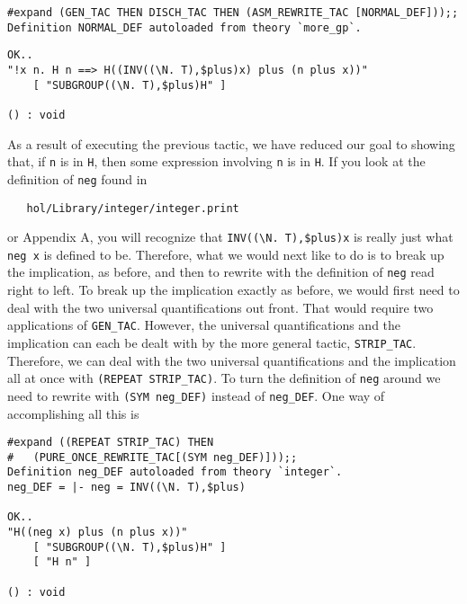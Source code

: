 \begin{session}
\begin{verbatim}
#expand (GEN_TAC THEN DISCH_TAC THEN (ASM_REWRITE_TAC [NORMAL_DEF]));;
Definition NORMAL_DEF autoloaded from theory `more_gp`.
\end{verbatim}
\mvdots
\begin{verbatim}
OK..
"!x n. H n ==> H((INV((\N. T),$plus)x) plus (n plus x))"
    [ "SUBGROUP((\N. T),$plus)H" ]

() : void
\end{verbatim}
\end{session}

As a result of executing the previous tactic, we have reduced our goal
to showing that, if {\small\tt n} is in {\small\tt H}, then some
expression involving {\small\tt n} is in {\small\tt H}.  If you look
at the definition of {\small\verb+neg+} found in
\begin{verbatim}
   hol/Library/integer/integer.print
\end{verbatim}
or Appendix A, you will recognize that
{\small\verb+INV((\N. T),$plus)x+} is really just what
{\small\verb+neg x+} is defined to be.  Therefore, what we would
next like to do is to break up the implication, as before, and 
then to rewrite with the definition of {\small\verb+neg+} read
right to left.  To break up the implication exactly as before, we
would first need to deal with the two universal quantifications out
front.  That would require two applications of
{\small\verb+GEN_TAC+}.  However, the universal quantifications
and the implication can each be dealt with by the more general tactic,
{\small\verb+STRIP_TAC+}.  Therefore, we can deal with the two
universal quantifications and the implication all at once with
{\small\verb+(REPEAT STRIP_TAC)+}.  To turn the definition of
{\small\verb+neg+} around we need to rewrite with
{\small\verb+(SYM neg_DEF)+} instead of
{\small\verb+neg_DEF+}.  One way of accomplishing all this is

\begin{session}
\begin{verbatim}
#expand ((REPEAT STRIP_TAC) THEN
#   (PURE_ONCE_REWRITE_TAC[(SYM neg_DEF)]));;
Definition neg_DEF autoloaded from theory `integer`.
neg_DEF = |- neg = INV((\N. T),$plus)

OK..
"H((neg x) plus (n plus x))"
    [ "SUBGROUP((\N. T),$plus)H" ]
    [ "H n" ]

() : void
\end{verbatim}
\end{session}

